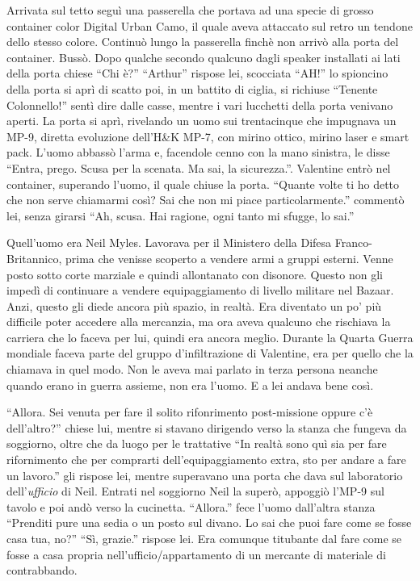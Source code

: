     Arrivata sul tetto seguì una passerella che portava ad una specie di grosso container color Digital Urban Camo, il
    quale aveva attaccato sul retro un tendone dello stesso colore. Continuò lungo la passerella finchè non arrivò alla
    porta del container. Bussò. Dopo qualche secondo qualcuno dagli speaker installati ai lati della porta chiese ``Chi
    è?'' ``Arthur'' rispose lei, scocciata ``AH!'' lo spioncino della porta si aprì di scatto poi, in un battito di
    ciglia, si richiuse ``Tenente Colonnello!'' sentì dire dalle casse, mentre i vari lucchetti della porta venivano
    aperti. La porta si aprì, rivelando un uomo sui trentacinque che impugnava un MP-9, diretta evoluzione dell'H\&K
    MP-7, con mirino ottico, mirino laser e smart pack. L'uomo abbassò l'arma e, facendole cenno con la mano sinistra,
    le disse ``Entra, prego. Scusa per la scenata. Ma sai, la sicurezza.''. Valentine entrò nel container, superando
    l'uomo, il quale chiuse la porta. ``Quante volte ti ho detto che non serve chiamarmi così? Sai che non mi piace
    particolarmente.'' commentò lei, senza girarsi ``Ah, scusa. Hai ragione, ogni tanto mi sfugge, lo sai.''

    Quell'uomo era Neil Myles. Lavorava per il Ministero della Difesa Franco-Britannico, prima che venisse scoperto a vendere
    armi a gruppi esterni. Venne posto sotto corte marziale e quindi allontanato con disonore. Questo non gli impedì di
    continuare a vendere equipaggiamento di livello militare nel Bazaar. Anzi, questo gli diede ancora più spazio, in
    realtà. Era diventato un po' più difficile poter accedere alla mercanzia, ma ora aveva qualcuno che rischiava la
    carriera che lo faceva per lui, quindi era ancora meglio. Durante la Quarta Guerra mondiale faceva parte del gruppo
    d'infiltrazione di Valentine, era per quello che la chiamava in quel modo. Non le aveva mai parlato in terza persona neanche
    quando erano in guerra assieme, non era l'uomo. E a lei andava bene così.

    ``Allora. Sei venuta per fare il solito rifonrimento post-missione oppure c'è dell'altro?'' chiese lui, mentre si
    stavano dirigendo verso la stanza che fungeva da soggiorno, oltre che da luogo per le trattative ``In realtà sono
    quì sia per fare rifornimento che per comprarti dell'equipaggiamento extra, sto per andare a fare un lavoro.'' gli
    rispose lei, mentre superavano una porta che dava sul laboratorio dell'\emph{ufficio} di Neil. Entrati nel soggiorno
    Neil la superò, appoggiò l'MP-9 sul tavolo e poi andò verso la cucinetta. ``Allora.'' fece l'uomo dall'altra stanza
    ``Prenditi pure una sedia o un posto sul divano. Lo sai che puoi fare come se fosse casa tua, no?'' ``Sì, grazie.''
    rispose lei. Era comunque titubante dal fare come se fosse a casa propria nell'ufficio/appartamento di un mercante
    di materiale di contrabbando.

